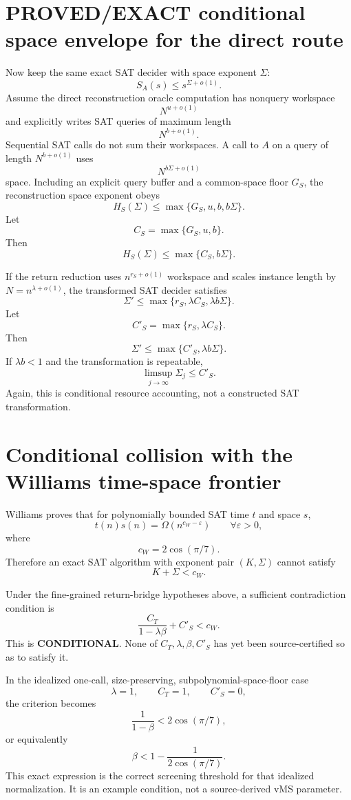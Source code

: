 \documentclass[11pt]{article}
\begin{document}
\section*{PROVED/EXACT conditional space envelope for the direct route}
Now keep the same exact SAT decider with space exponent \(\Sigma\):
\[
S_A(s)\le s^{\Sigma+o(1)}.
\]
Assume the direct reconstruction oracle computation has nonquery workspace
\[
N^{u+o(1)}
\]
and explicitly writes SAT queries of maximum length
\[
N^{b+o(1)}.
\]
Sequential SAT calls do not sum their workspaces. A call to \(A\) on a query of length \(N^{b+o(1)}\) uses
\[
N^{b\Sigma+o(1)}
\]
space. Including an explicit query buffer and a common-space floor \(G_S\), the reconstruction space exponent obeys
\[
\boxed{
H_S(\Sigma)
\le
\max\{G_S,u,b,b\Sigma\}.
}
\]
Let
\[
C_S=\max\{G_S,u,b\}.
\]
Then
\[
\boxed{
H_S(\Sigma)\le\max\{C_S,b\Sigma\}.
}
\]

If the return reduction uses \(n^{r_S+o(1)}\) workspace and scales instance length by \(N=n^{\lambda+o(1)}\), the transformed SAT decider satisfies
\[
\Sigma'
\le
\max\{r_S,\lambda C_S,\lambda b\Sigma\}.
\]
Let
\[
C'_S=\max\{r_S,\lambda C_S\}.
\]
Then
\[
\boxed{
\Sigma'\le\max\{C'_S,\lambda b\Sigma\}.
}
\]
If \(\lambda b<1\) and the transformation is repeatable,
\[
\boxed{
\limsup_{j\to\infty}\Sigma_j\le C'_S.
}
\]
Again, this is conditional resource accounting, not a constructed SAT transformation.

\section*{Conditional collision with the Williams time-space frontier}
Williams proves that for polynomially bounded SAT time \(t\) and space \(s\),
\[
t(n)s(n)=
\Omega\!\left(
n^{c_W-\varepsilon}
\right)
\qquad
\forall\varepsilon>0,
\]
where
\[
c_W=2\cos(\pi/7).
\]
Therefore an exact SAT algorithm with exponent pair \((K,\Sigma)\) cannot satisfy
\[
K+\Sigma<c_W.
\]

Under the fine-grained return-bridge hypotheses above, a sufficient contradiction condition is
\[
\boxed{
\frac{C_T}{1-\lambda\beta}+C'_S<c_W.
}
\]
This is \textbf{CONDITIONAL}. None of \(C_T,\lambda,\beta,C'_S\) has yet been source-certified so as to satisfy it.

In the idealized one-call, size-preserving, subpolynomial-space-floor case
\[
\lambda=1,\qquad C_T=1,\qquad C'_S=0,
\]
the criterion becomes
\[
\frac{1}{1-\beta}<2\cos(\pi/7),
\]
or equivalently
\[
\boxed{
\beta<
1-\frac{1}{2\cos(\pi/7)}.
}
\]
This exact expression is the correct screening threshold for that idealized normalization. It is an example condition, not a source-derived vMS parameter.
\end{document}
